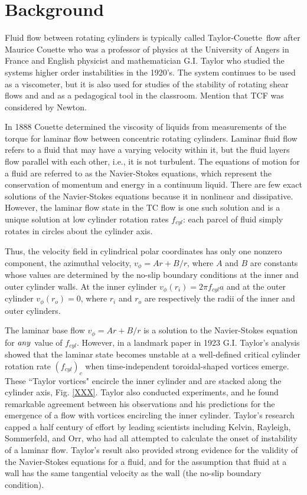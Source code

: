 \documentclass[%
reprint,
 amsmath,amssymb,
 aps,
prb,
floatfix,
longbibliography,
notitlepage
]{revtex4-1}
\newcommand{\DB}[1]{{\color{red}#1}} %
\newcommand{\TC}{Taylor-Couette}
\newcommand{\rad}[1]{\ensuremath{r_{#1}}} %
\begin{document}
\section {Background}
Fluid flow between rotating cylinders is typically called  \TC\ flow after Maurice Couette who was a professor of physics at the University of Angers in France and English physicist and mathematician G.I. Taylor who studied the systems higher order instabilities in the 1920's.\cite{couette_taylor}  The system continues to be used as a viscometer, but it is also used for studies of the stability of rotating shear flows and and as a pedagogical tool in the classroom. \DB{Mention that TCF was considered by Newton.}

In 1888 Couette determined the viscosity of liquids from measurements of the torque for laminar flow between concentric rotating cylinders.\cite{couette} Laminar fluid flow refers to a fluid that may have a varying velocity within it, but the fluid layers flow parallel with each other, i.e., it is not turbulent. The equations of motion for a fluid are referred to as the Navier-Stokes equations, which represent the conservation of momentum and energy in a continuum liquid. There are few exact solutions of the Navier-Stokes equations because it in nonlinear and dissipative. However, the laminar flow state in the TC flow is one such solution and is a unique solution at low cylinder rotation rates $f_{cyl}$: each parcel of fluid simply rotates in circles about the cylinder axis. 
 
 Thus, the velocity field in cylindrical polar coordinates has only one nonzero component, the azimuthal velocity, $v_\phi = Ar + B/r$, where $A$ and $B$ are constants whose values are determined by the no-slip boundary conditions at the inner and outer cylinder walls. At the inner cylinder $v_\phi(\rad{i})= 2\pi f_{cyl}a$  and at the outer cylinder $v_{\phi}(\rad{o}) = 0$, where $\rad{i}$ and $\rad{o}$ are respectively the radii of the inner and outer cylinders.

The laminar base flow $v_\phi = Ar + B/r$ is a solution to the Navier-Stokes equation for $\it any$ value of $f_{cyl}$. However, in a landmark paper in 1923 G.I. Taylor's analysis showed that the laminar state becomes unstable at a well-defined critical cylinder rotation rate $(f_{cyl})_c$ when time-independent toroidal-shaped vortices emerge.\cite{Taylor} These ``Taylor vortices" encircle the inner cylinder and are stacked along the cylinder axis, Fig. \ref{XXX}.  Taylor also conducted experiments, and he found remarkable agreement between his observations and his predictions for the emergence of a flow with vortices encircling the inner cylinder.  Taylor's research capped a half century of effort by leading scientists including Kelvin, Rayleigh, Sommerfeld, and Orr, who had all attempted to calculate the onset of instability of a laminar flow.  Taylor's result also provided strong evidence for the validity of the Navier-Stokes equations for a fluid, and for the assumption that fluid at a wall has the same tangential velocity as the wall (the no-slip boundary condition).  
\end{document}
